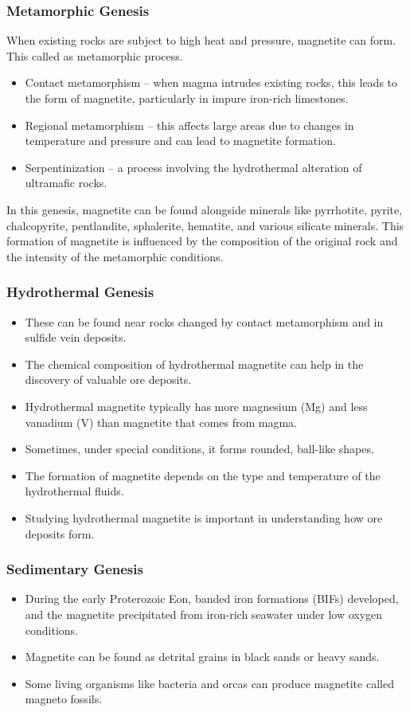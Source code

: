 \documentclass[12pt,a4paper, top=1.9cm, bottom=2.03cm, left=3.81cm, right=1.9cm]{article}
\begin{document}
\subsubsection{Metamorphic Genesis}
\noindent\fontsize{12}{14}\selectfont When existing rocks are subject to high heat and pressure, magnetite can form. This called as metamorphic process.
\begin{itemize}[label=\textbullet]  %
\item Contact metamorphism – when magma intrudes existing rocks, this leads to the form of magnetite, particularly in impure iron-rich limestones.
\item Regional metamorphism – this affects large areas due to changes in temperature and pressure and can lead to magnetite formation.
\item Serpentinization – a process involving the hydrothermal alteration of ultramafic rocks.
\end{itemize}
\noindent\fontsize{12}{14}\selectfont In this genesis, magnetite can be found alongside minerals like pyrrhotite, pyrite, chalcopyrite, pentlandite, sphalerite, hematite, and various silicate minerals. This formation of magnetite is influenced by the composition of the original rock and the intensity of the metamorphic conditions.
\subsubsection{Hydrothermal Genesis}
\begin{itemize}[label=\textbullet]  %
\item These can be found near rocks changed by contact metamorphism and in sulfide vein deposits. 
\item The chemical composition of hydrothermal magnetite can help in the discovery of valuable ore deposits.
\item Hydrothermal magnetite typically has more magnesium (Mg) and less vanadium (V) than magnetite that comes from magma.
\item Sometimes, under special conditions, it forms rounded, ball-like shapes.
\item The formation of magnetite depends on the type and temperature of the hydrothermal fluids.
\item Studying hydrothermal magnetite is important in understanding how ore deposits form.
\end{itemize}
\subsubsection{Sedimentary Genesis}
\begin{itemize}[label=\textbullet]  %
\item During the early Proterozoic Eon, banded iron formations (BIFs) developed, and the magnetite precipitated from iron-rich seawater under low oxygen conditions. 
\item Magnetite can be found as detrital grains in black sands or heavy sands.
\item Some living organisms like bacteria and orcas can produce magnetite called magneto fossils. 
\end{itemize}
\newpage
\end{document}
